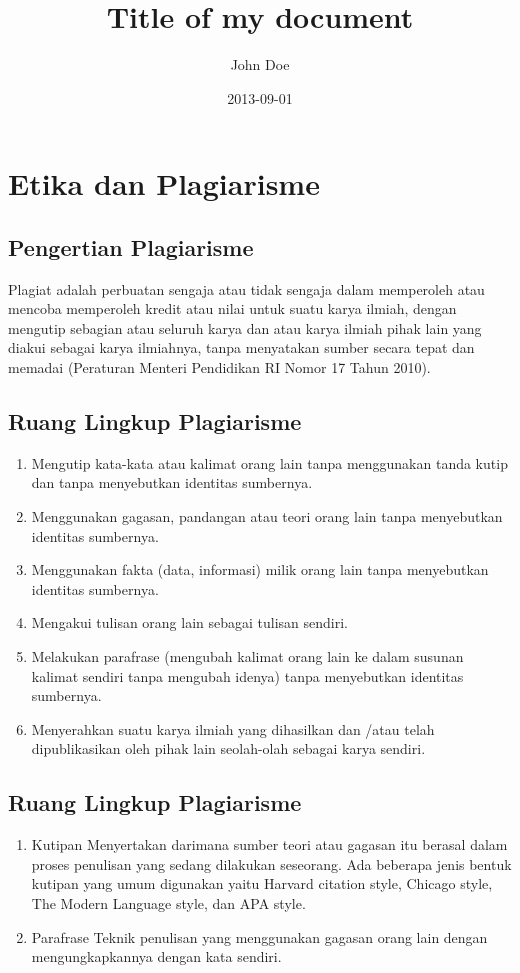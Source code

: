\documentclass{article}
\title{Title of my document}
\date{2013-09-01}
\author{John Doe}
\begin{document}
\maketitle
{}
\newpage
{}

\section{Etika dan Plagiarisme}

\subsection{Pengertian Plagiarisme}

Plagiat adalah perbuatan sengaja atau tidak sengaja dalam memperoleh atau mencoba memperoleh kredit atau nilai untuk suatu karya ilmiah, dengan mengutip sebagian atau seluruh karya dan atau karya ilmiah pihak lain yang diakui sebagai karya ilmiahnya, tanpa menyatakan sumber secara tepat dan memadai (Peraturan Menteri Pendidikan RI Nomor 17 Tahun 2010).

\subsection{Ruang Lingkup Plagiarisme}
\begin{enumerate}
  \item Mengutip kata-kata atau kalimat orang lain tanpa menggunakan tanda kutip dan tanpa menyebutkan identitas sumbernya.
  \item Menggunakan gagasan, pandangan atau teori orang lain tanpa menyebutkan identitas sumbernya.
  \item Menggunakan fakta (data, informasi) milik orang lain tanpa menyebutkan identitas sumbernya.
  \item Mengakui tulisan orang lain sebagai tulisan sendiri.
  \item Melakukan parafrase (mengubah kalimat orang lain ke dalam susunan kalimat sendiri tanpa mengubah idenya) tanpa menyebutkan identitas sumbernya.
  \item Menyerahkan suatu karya ilmiah yang dihasilkan dan /atau telah dipublikasikan oleh pihak lain seolah-olah sebagai karya sendiri.
\end{enumerate}

\subsection{Ruang Lingkup Plagiarisme}
\begin{enumerate}
    \item Kutipan 
     \newline Menyertakan darimana sumber teori atau gagasan itu berasal dalam proses penulisan yang sedang dilakukan seseorang. Ada beberapa jenis bentuk kutipan yang umum digunakan yaitu Harvard citation style, Chicago style, The Modern Language style, dan APA style.
     \item Parafrase
     \newline Teknik penulisan yang menggunakan gagasan orang lain dengan mengungkapkannya dengan
kata sendiri.


\end{enumerate}
\end{document}
